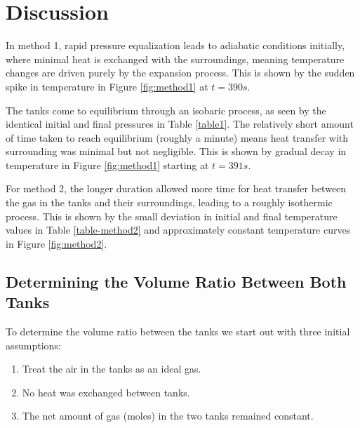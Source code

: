 \documentclass[titlepage, twocolumn, 12pt]{article}
\begin{document}
\section{Discussion}

In method 1, rapid pressure equalization leads to adiabatic conditions initially, where minimal heat is exchanged with the surroundings, meaning temperature changes are driven purely by the expansion process. This is shown by the sudden spike in temperature in Figure \ref{fig:method1} at $t=390s$. 

The tanks come to equilibrium through an isobaric process, as seen by the identical initial and final pressures in Table \ref{table1}. The relatively short amount of time taken to reach equilibrium (roughly a minute) means heat transfer with surrounding was minimal but not negligible. This is shown by gradual decay in temperature in Figure \ref{fig:method1} starting at $t=391s$.

For method 2, the longer duration allowed more time for heat transfer between the gas in the tanks and their surroundings, leading to a roughly isothermic process. This is shown by the small deviation in initial and final temperature values in Table \ref{table-method2} and approximately constant temperature curves in Figure \ref{fig:method2}.

\subsection{Determining the Volume Ratio Between Both Tanks}

To determine the volume ratio between the tanks we start out with three initial assumptions:
\begin{enumerate}
    \item Treat the air in the tanks as an ideal gas.
    \item No heat was exchanged between tanks.
    \item The net amount of gas (moles) in the two tanks remained constant.
\end{enumerate}
\end{document}
